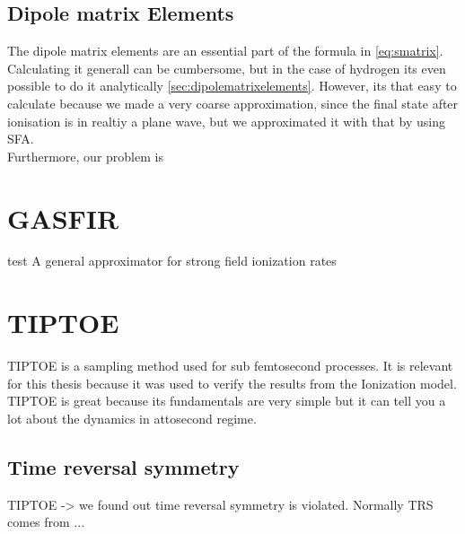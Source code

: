 \subsection{Dipole matrix Elements}
The dipole matrix elements are an essential part of the formula in \eqref{eq:smatrix}. 
Calculating it generall can be cumbersome, but in the case of hydrogen its even possible to do it analytically \ref{sec:dipolematrixelements}.
However, its that easy to calculate because we made a very coarse approximation, since the final state after ionisation is in realtiy a plane wave, but we approximated it with that by using SFA.\\
Furthermore, our problem is 







\section{GASFIR}
test
A general approximator for strong field ionization rates

\section{TIPTOE}
TIPTOE \cite{Park:18} is a sampling method used for sub femtosecond processes. It is relevant for this thesis because it was used to verify the results from the Ionization model. 
TIPTOE is great because its fundamentals are very simple but it can tell you a lot about the dynamics in attosecond regime. 

\subsection{Time reversal symmetry}
TIPTOE -> we found out time reversal symmetry is violated. Normally TRS comes from ...

